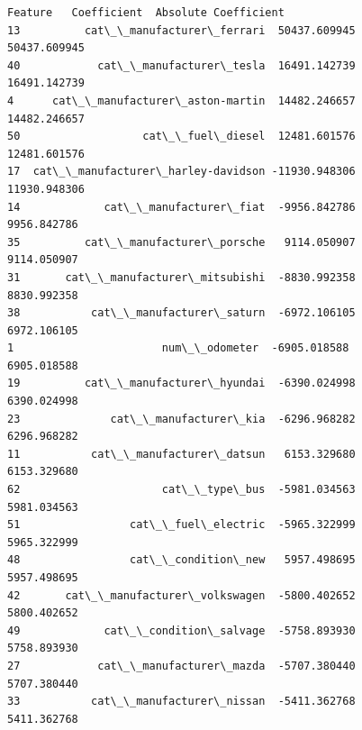 \documentclass[11pt]{article}
\makeatletter
\newcommand{\boxspacing}{\kern\kvtcb@left@rule\kern\kvtcb@boxsep}
\newcommand{\prompt}[4]{
        {\ttfamily\llap{{\color{#2}[#3]:\hspace{3pt}#4}}\vspace{-\baselineskip}}
    }
\makeatother
\begin{document}
            \begin{tcolorbox}[breakable, size=fbox, boxrule=.5pt, pad at break*=1mm, opacityfill=0]
\prompt{Out}{outcolor}{15}{\boxspacing}
\begin{Verbatim}[commandchars=\\\{\}]
                              Feature   Coefficient  Absolute Coefficient
13          cat\_\_manufacturer\_ferrari  50437.609945          50437.609945
40            cat\_\_manufacturer\_tesla  16491.142739          16491.142739
4      cat\_\_manufacturer\_aston-martin  14482.246657          14482.246657
50                   cat\_\_fuel\_diesel  12481.601576          12481.601576
17  cat\_\_manufacturer\_harley-davidson -11930.948306          11930.948306
14             cat\_\_manufacturer\_fiat  -9956.842786           9956.842786
35          cat\_\_manufacturer\_porsche   9114.050907           9114.050907
31       cat\_\_manufacturer\_mitsubishi  -8830.992358           8830.992358
38           cat\_\_manufacturer\_saturn  -6972.106105           6972.106105
1                       num\_\_odometer  -6905.018588           6905.018588
19          cat\_\_manufacturer\_hyundai  -6390.024998           6390.024998
23              cat\_\_manufacturer\_kia  -6296.968282           6296.968282
11           cat\_\_manufacturer\_datsun   6153.329680           6153.329680
62                      cat\_\_type\_bus  -5981.034563           5981.034563
51                 cat\_\_fuel\_electric  -5965.322999           5965.322999
48                 cat\_\_condition\_new   5957.498695           5957.498695
42       cat\_\_manufacturer\_volkswagen  -5800.402652           5800.402652
49             cat\_\_condition\_salvage  -5758.893930           5758.893930
27            cat\_\_manufacturer\_mazda  -5707.380440           5707.380440
33           cat\_\_manufacturer\_nissan  -5411.362768           5411.362768
\end{Verbatim}
\end{tcolorbox}
        
    \begin{tcolorbox}[breakable, size=fbox, boxrule=1pt, pad at break*=1mm,colback=cellbackground, colframe=cellborder]
\prompt{In}{incolor}{ }{\boxspacing}
\begin{Verbatim}[commandchars=\\\{\}]

\end{Verbatim}
\end{tcolorbox}

    \begin{tcolorbox}[breakable, size=fbox, boxrule=1pt, pad at break*=1mm,colback=cellbackground, colframe=cellborder]
\prompt{In}{incolor}{ }{\boxspacing}
\begin{Verbatim}[commandchars=\\\{\}]

\end{Verbatim}
\end{tcolorbox}
\end{document}
